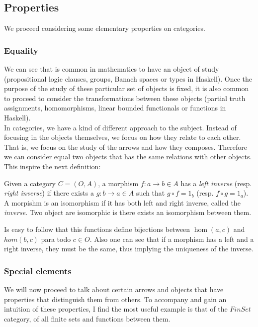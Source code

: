 \subsection{Properties}
We proceed considering some elementary properties on categories.

\subsubsection{Equality}
We can see that is common in mathematics to have an object of study (propositional logic clauses, groups, Banach spaces or types in Haskell). Once the purpose of the study of these particular set of objects is fixed, it is also common to proceed to consider the transformations between these objects (partial truth assignments, homomorphisms, linear bounded functionals or  functions in Haskell).\\

In categories, we have a kind of different approach to the subject. Instead of focusing in the objects themselves, we focus on how they relate to each other. That is, we focus on the study of the arrows and how they composes. Therefore we can consider equal two objects that has the same relations with other objects. This inspire the next definition:

\begin{definition}
  Given a category $C=(O,A)$, a morphism $f: a \to b \in A$ has a \emph{left inverse} (resp. \emph{right inverse}) if there exists a $g: b \to a \in A$ such that $g \circ f = 1_b$ (resp. $f \circ g = 1_a$). A morpishm is an isomorphism if it has both left and right inverse, called the \emph{inverse}. Two object are isomorphic is there exists an isomorphism between them.
\end{definition}


Is easy to follow that this functions define bijections between $\hom(a,c)$ and $hom(b,c)$ para todo $c\in O$. Also one can see that if a morphism has a left and a right inverse, they must be the same, thus implying the uniqueness of the inverse.

\subsubsection{Special elements}

We will now proceed to talk about certain arrows and objects that have properties that distinguish them from others. To accompany and gain an intuition of these properties, I find the most useful example is that of the $FinSet$ category, of all finite sets and functions between them.  \\

